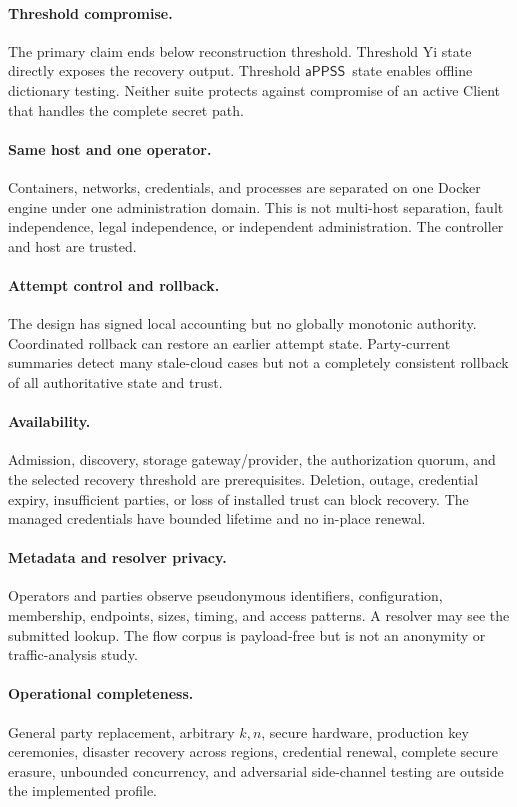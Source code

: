 \documentclass[sigconf,anonymous]{acmart}
\newcommand{\APPSS}{\ensuremath{\mathsf{aPPSS}}}
\begin{document}
\paragraph{Threshold compromise.}
The primary claim ends below reconstruction threshold. Threshold Yi state
directly exposes the recovery output. Threshold \APPSS\ state enables offline
dictionary testing. Neither suite protects against compromise of an active
Client that handles the complete secret path.

\paragraph{Same host and one operator.}
Containers, networks, credentials, and processes are separated on one Docker
engine under one administration domain. This is not multi-host separation,
fault independence, legal independence, or independent administration. The
controller and host are trusted.

\paragraph{Attempt control and rollback.}
The design has signed local accounting but no globally monotonic authority.
Coordinated rollback can restore an earlier attempt state. Party-current
summaries detect many stale-cloud cases but not a completely consistent
rollback of all authoritative state and trust.

\paragraph{Availability.}
Admission, discovery, storage gateway/provider, the authorization quorum, and
the selected recovery threshold are prerequisites. Deletion, outage,
credential expiry, insufficient parties, or loss of installed trust can block
recovery. The managed credentials have bounded lifetime and no in-place
renewal.

\paragraph{Metadata and resolver privacy.}
Operators and parties observe pseudonymous identifiers, configuration,
membership, endpoints, sizes, timing, and access patterns. A resolver may see
the submitted lookup. The flow corpus is payload-free but is not an anonymity
or traffic-analysis study.

\paragraph{Operational completeness.}
General party replacement, arbitrary \(k,n\), secure hardware, production key
ceremonies, disaster recovery across regions, credential renewal, complete
secure erasure, unbounded concurrency, and adversarial side-channel testing
are outside the implemented profile.
\end{document}
